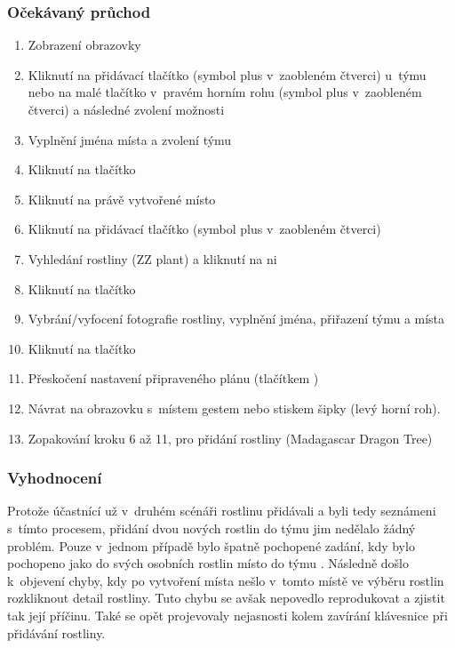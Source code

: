 \documentclass[thesis=M,czech]{FITthesis}[2019/12/23]
\begin{document}
\subsubsection*{Očekávaný průchod}
\begin{enumerate}
    \item Zobrazení obrazovky 
    \item Kliknutí na přidávací tlačítko (symbol plus v~zaobleném čtverci) u~týmu  nebo na malé tlačítko v~pravém horním rohu (symbol plus v~zaobleném čtverci) a následné zvolení možnosti 
    \item Vyplnění jména místa a zvolení týmu 
    \item Kliknutí na tlačítko 
    \item Kliknutí na právě vytvořené místo 
    \item Kliknutí na přidávací tlačítko (symbol plus v~zaobleném čtverci)
    \item Vyhledání rostliny (ZZ plant) a kliknutí na ni
    \item Kliknutí na tlačítko 
    \item Vybrání/vyfocení fotografie rostliny, vyplnění jména, přiřazení týmu a místa
    \item Kliknutí na tlačítko 
    \item Přeskočení nastavení připraveného plánu (tlačítkem )
    \item Návrat na obrazovku s~místem  gestem nebo stiskem šipky (levý horní roh).
    \item Zopakování kroku 6 až 11, pro přidání rostliny (Madagascar Dragon Tree)
\end{enumerate}
\subsubsection*{Vyhodnocení}
Protože účastnící už v~druhém scénáři rostlinu přidávali a byli tedy seznámeni s~tímto procesem, přidání dvou nových rostlin do týmu jim nedělalo žádný problém. Pouze v~jednom případě bylo špatně pochopené zadání, kdy  bylo pochopeno jako do svých osobních rostlin místo do týmu . Následně došlo k~objevení chyby, kdy po vytvoření místa nešlo v~tomto místě ve výběru rostlin rozkliknout detail rostliny. Tuto chybu se avšak nepovedlo reprodukovat a zjistit tak její příčinu. Také se opět projevovaly nejasnosti kolem zavírání klávesnice při přidávání rostliny.
\end{document}
